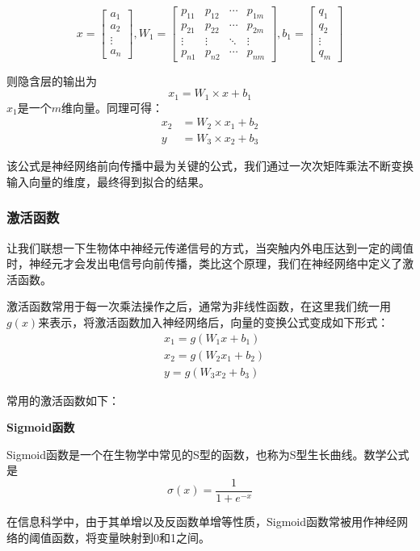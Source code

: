 \documentclass[bwprint]{cumcmthesis}
\begin{document}
\[
x = \left[
\begin{matrix}
a_1\\ a_2\\ \vdots\\ a_n
\end{matrix}
\right],
W_1 = \left[
\begin{matrix}
p_{11} & p_{12} & \cdots & p_{1m}\\
p_{21} & p_{22} & \cdots & p_{2m}\\
\vdots & \vdots & \ddots & \vdots\\
p_{n1} & p_{n2} & \cdots & p_{nm}
\end{matrix}
\right],
b_1 = \left[
\begin{matrix}
q_1\\ q_2\\ \vdots\\ q_m
\end{matrix}
\right]
\]

则隐含层的输出为
\[x_1 = W_1\times x + b_1\]
$x_1$是一个$m$维向量。同理可得：
\[
\begin{split}
x_2 &= W_2\times x_1 + b_2\\
y &= W_3\times x_2 + b_3
\end{split}
\]

该公式是神经网络前向传播中最为关键的公式，我们通过一次次矩阵乘法不断变换输入向量的维度，最终得到拟合的结果。

\subsubsection{激活函数} 让我们联想一下生物体中神经元传递信号的方式，当突触内外电压达到一定的阈值时，神经元才会发出电信号向前传播，类比这个原理，我们在神经网络中定义了激活函数。

激活函数常用于每一次乘法操作之后，通常为非线性函数，在这里我们统一用$g(x)$来表示，将激活函数加入神经网络后，向量的变换公式变成如下形式：
\[
\begin{split}
&x_1 = g(W_1 x + b_1)\\
&x_2 = g(W_2 x_1 + b_2)\\
&y = g(W_3 x_2 + b_3)
\end{split}
\]

常用的激活函数如下：

\textbf{Sigmoid函数}

Sigmoid函数是一个在生物学中常见的S型的函数，也称为S型生长曲线。数学公式是
\[\sigma (x) = \frac{1}{1 + e^{-x}}\]

在信息科学中，由于其单增以及反函数单增等性质，Sigmoid函数常被用作神经网络的阈值函数，将变量映射到0和1之间。
\end{document}
